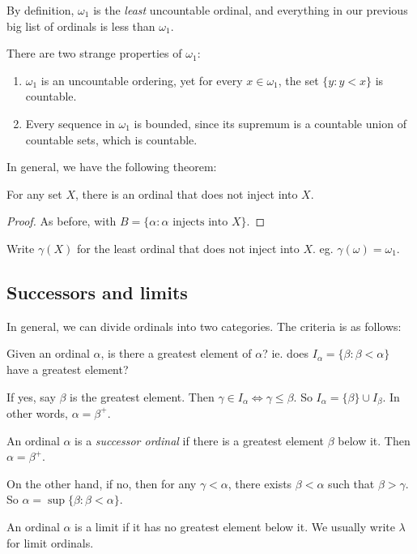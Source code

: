 \documentclass[a4paper]{article}
\begin{document}
By definition, $\omega_1$ is the \emph{least} uncountable ordinal, and everything in our previous big list of ordinals is less than $\omega_1$.

There are two strange properties of $\omega_1$:
\begin{enumerate}
  \item $\omega_1$ is an uncountable ordering, yet for every $x\in \omega_1$, the set $\{y: y< x\}$ is countable.
  \item Every sequence in $\omega_1$ is bounded, since its supremum is a countable union of countable sets, which is countable.
\end{enumerate}

In general, we have the following theorem:
\begin{thm}
  For any set $X$, there is an ordinal that does not inject into $X$.
\end{thm}

\begin{proof}
  As before, with $B = \{\alpha: \alpha\text{ injects into }X\}$.
\end{proof}

\begin{notation}
  Write $\gamma(X)$ for the least ordinal that does not inject into $X$. eg. $\gamma(\omega) = \omega_1$.
\end{notation}

\subsection{Successors and limits}
In general, we can divide ordinals into two categories. The criteria is as follows:

Given an ordinal $\alpha$, is there a greatest element of $\alpha$? ie. does $I_\alpha = \{\beta: \beta < \alpha\}$ have a greatest element?

If yes, say $\beta$ is the greatest element. Then $\gamma\in I_\alpha \Leftrightarrow \gamma \leq \beta$. So $I_\alpha = \{\beta\}\cup I_\beta$. In other words, $\alpha = \beta^+$.

\begin{defi}
  An ordinal $\alpha$ is a \emph{successor ordinal} if there is a greatest element $\beta$ below it. Then $\alpha = \beta^+$.
\end{defi}

On the other hand, if no, then for any $\gamma < \alpha$, there exists $\beta < \alpha$ such that $\beta > \gamma$. So $\alpha = \sup \{\beta: \beta < \alpha\}$.
\begin{defi}
  An ordinal $\alpha$ is a limit if it has no greatest element below it. We usually write $\lambda$ for limit ordinals.
\end{defi}
\end{document}
